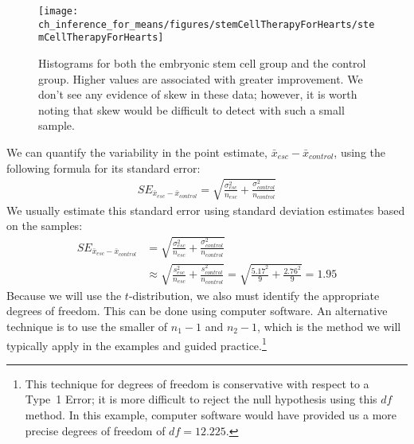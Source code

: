 {\begin{figure}[h]
\centering
\texttt{[image: ch\_inference\_for\_means/figures/stemCellTherapyForHearts/stemCellTherapyForHearts]}
\caption{Histograms for both the embryonic stem cell group and the control group. Higher values are associated with greater improvement. We don't see any evidence of skew in these data; however, it is worth noting that skew would be difficult to detect with such a small sample.}
\label{stemCellTherapyForHearts}
\end{figure}



We can quantify the variability in the point estimate, $\bar{x}_{esc} - \bar{x}_{control}$, using the following formula for its standard error:
\begin{eqnarray*}
SE_{\bar{x}_{esc} - \bar{x}_{control}} = \sqrt{\frac{\sigma_{esc}^2}{n_{esc}} + \frac{\sigma_{control}^2}{n_{control}}}
\end{eqnarray*}
We usually estimate this standard error using standard deviation estimates  based on the samples:
\begin{align*}
SE_{\bar{x}_{esc} - \bar{x}_{control}}
	&= \sqrt{\frac{\sigma_{esc}^2}{n_{esc}} + \frac{\sigma_{control}^2}{n_{control}}} \\
	&\approx \sqrt{\frac{s_{esc}^2}{n_{esc}} + \frac{s_{control}^2}{n_{control}}}
	= \sqrt{\frac{5.17^2}{9} + \frac{2.76^2}{9}} = 1.95
\end{align*}
Because we will use the $t$-distribution, we also must identify the appropriate degrees of freedom. This can be done using computer software. An alternative technique is to use the smaller of $n_1 - 1$ and $n_2 - 1$, which is the method we will typically apply in the examples and guided practice.\footnote{This technique for degrees of freedom is conservative with respect to a Type~1 Error; it is more difficult to reject the null hypothesis using this $df$ method. In this example, computer software would have provided us a more precise degrees of freedom of $df = 12.225$.}

}
